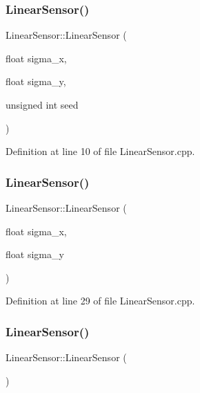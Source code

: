 \subsubsection{\texorpdfstring{Linear\+Sensor()}{LinearSensor()}\hspace{0.1cm}{\footnotesize\ttfamily [1/5]}}
{\footnotesize\ttfamily Linear\+Sensor\+::\+Linear\+Sensor (\begin{DoxyParamCaption}\item[{float}]{sigma\+\_\+x,  }\item[{float}]{sigma\+\_\+y,  }\item[{unsigned int}]{seed }\end{DoxyParamCaption})\hspace{0.3cm}{\ttfamily [noexcept]}}



Definition at line 10 of file Linear\+Sensor.\+cpp.

\mbox{\label{classbfl_1_1LinearSensor_abbd0d6d3a0deb476e1bacaf646dac55f}} 
\subsubsection{\texorpdfstring{Linear\+Sensor()}{LinearSensor()}\hspace{0.1cm}{\footnotesize\ttfamily [2/5]}}
{\footnotesize\ttfamily Linear\+Sensor\+::\+Linear\+Sensor (\begin{DoxyParamCaption}\item[{float}]{sigma\+\_\+x,  }\item[{float}]{sigma\+\_\+y }\end{DoxyParamCaption})\hspace{0.3cm}{\ttfamily [noexcept]}}



Definition at line 29 of file Linear\+Sensor.\+cpp.

\mbox{\label{classbfl_1_1LinearSensor_a97d9226a08646f7c97a0e1b0cc0cb672}} 
\subsubsection{\texorpdfstring{Linear\+Sensor()}{LinearSensor()}\hspace{0.1cm}{\footnotesize\ttfamily [3/5]}}
{\footnotesize\ttfamily Linear\+Sensor\+::\+Linear\+Sensor (\begin{DoxyParamCaption}{ }\end{DoxyParamCaption})\hspace{0.3cm}{\ttfamily [noexcept]}}



